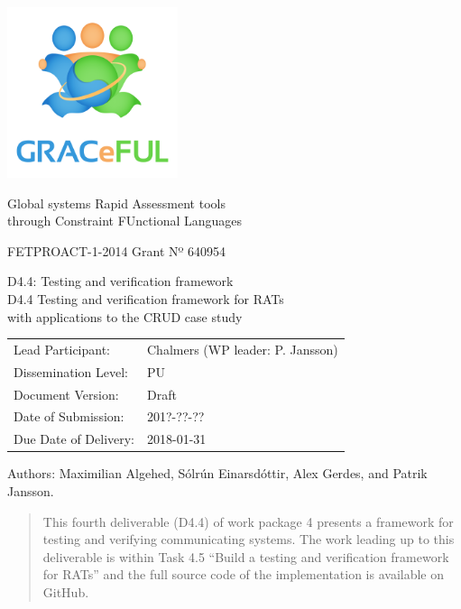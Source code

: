 \documentclass{article}
\author{}
\date{}
\begin{document}
\begin{center}
\includegraphics[width=5cm]{../coverpage/GRACeFULlogo.png}

\textcolor{GRACeFULblue}{Global systems Rapid Assessment tools\\
through Constraint FUnctional Languages}

\vspace{1cm}

FETPROACT-1-2014 Grant Nº 640954

\end{center}

\begin{framed}
\begin{center}
\Large
D4.4: Testing and verification framework\\[1ex]

\large
D4.4 Testing and verification framework for RATs\\
with applications to the CRUD case study\\[1ex]

\end{center}
\end{framed}

\vspace{1cm}

\noindent
\begin{tabular}{@{}ll@{}}
  Lead Participant:       & Chalmers (WP leader: P. Jansson)
\\Dissemination Level:    & PU
\\Document Version:       & Draft
\\Date of Submission:     & 201?-??-??
\\Due Date of Delivery:   & 2018-01-31
\end{tabular}

Authors: Maximilian Algehed, Sólrún Einarsdóttir, Alex Gerdes, and
Patrik Jansson.

\begin{abstract}

This fourth deliverable (D4.4) of work package 4 presents a framework for
testing and verifying communicating systems.
%
The work leading up to this deliverable is within Task 4.5 ``Build a
testing and verification framework for RATs'' and the full source code
of the implementation is available on GitHub.

\end{abstract}
\newpage
\end{document}

